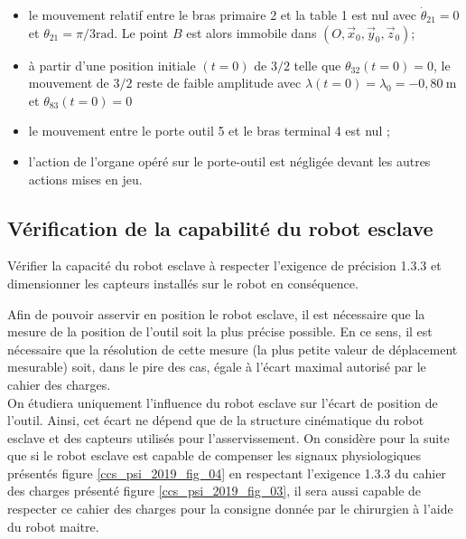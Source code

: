 \begin{itemize}
  \item le mouvement relatif entre le bras primaire 2 et la table 1 est nul avec $\dot{\theta}_{21}=0$ et $\theta_{21}=\pi / 3 \mathrm{rad}$. Le point $B$ est alors immobile dans $\left(O, \vec{x}_{0}, \vec{y}_{0}, \vec{z}_{0}\right)$;
  \item à partir d'une position initiale $(t=0)$ de $3 / 2$ telle que $\theta_{32}(t=0)=0$, le mouvement de $3 / 2$ reste de faible amplitude avec $\lambda(t=0)=\lambda_{0}=-0,80 \mathrm{~m}$ et $\theta_{83}(t=0)=0$
  \item le mouvement entre le porte outil 5 et le bras terminal 4 est nul ;
  \item l'action de l'organe opéré sur le porte-outil est négligée devant les autres actions mises en jeu.
\end{itemize}
\fi

\subsection{Vérification de la capabilité du robot esclave}
\begin{obj}
Vérifier la capacité du robot esclave à respecter l'exigence de précision 1.3.3 et dimensionner les capteurs installés sur le robot en conséquence.
\end{obj}


\ifprof
\else
Afin de pouvoir asservir en position le robot esclave, il est nécessaire que la mesure de la position de l'outil soit la plus précise possible. En ce sens, il est nécessaire que la résolution de cette mesure (la plus petite valeur de déplacement mesurable) soit, dans le pire des cas, égale à l'écart maximal autorisé par le cahier des charges.\\
On étudiera uniquement l'influence du robot esclave sur l'écart de position de l'outil. Ainsi, cet écart ne dépend que de la structure cinématique du robot esclave et des capteurs utilisés pour l'asservissement. On considère pour la suite que si le robot esclave est capable de compenser les signaux physiologiques présentés figure \ref{ccs_psi_2019_fig_04} en respectant l'exigence 1.3.3 du cahier des charges présenté figure \ref{ccs_psi_2019_fig_03}, il sera aussi capable de respecter ce cahier des charges pour la consigne donnée par le chirurgien à l'aide du robot maitre.\\
\fi

